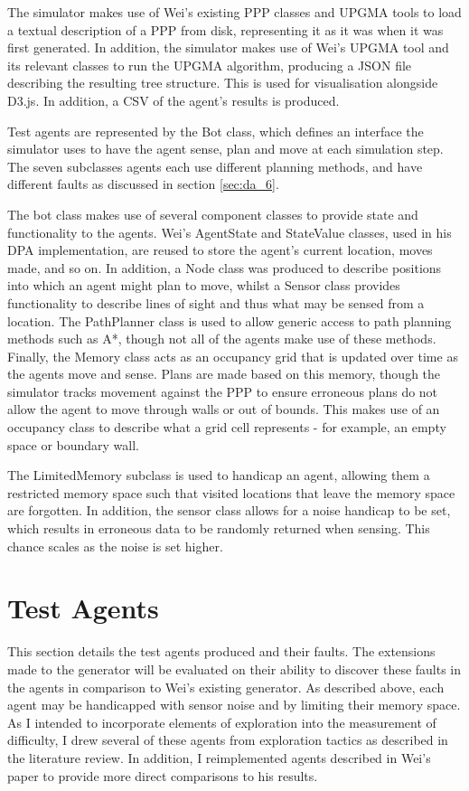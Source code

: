 \documentclass[authoryearcitations]{UoYCSproject}
\begin{document}
The simulator makes use of Wei's existing PPP classes and UPGMA tools to load a textual description of a PPP from disk, representing it as it was when it was first generated. In addition, the simulator makes use of Wei's UPGMA tool and its relevant classes to run the UPGMA algorithm, producing a JSON file describing the resulting tree structure. This is used for visualisation alongside D3.js. In addition, a CSV of the agent’s results is produced.

Test agents are represented by the Bot class, which defines an interface the simulator uses to have the agent sense, plan and move at each simulation step. The seven subclasses agents each use different planning methods, and have different faults as discussed in section \ref{sec:da_6}.

The bot class makes use of several component classes to provide state and functionality to the agents. Wei's AgentState and StateValue classes, used in his DPA implementation, are reused to store the agent's current location, moves made, and so on. In addition, a Node class was produced to describe positions into which an agent might plan to move, whilst a Sensor class provides functionality to describe lines of sight and thus what may be sensed from a location. The PathPlanner class is used to allow generic access to path planning methods such as A*, though not all of the agents make use of these methods. Finally, the Memory class acts as an occupancy grid that is updated over time as the agents move and sense. Plans are made based on this memory, though the simulator tracks movement against the PPP to ensure erroneous plans do not allow the agent to move through walls or out of bounds. This makes use of an occupancy class to describe what a grid cell represents - for example, an empty space or boundary wall.

The LimitedMemory subclass is used to handicap an agent, allowing them a restricted memory space such that visited locations that leave the memory space are forgotten. In addition, the sensor class allows for a noise handicap to be set, which results in erroneous data to be randomly returned when sensing. This chance scales as the noise is set higher.

\section{Test Agents}
\label{sec:da_5}
This section details the test agents produced and their faults. The extensions made to the generator will be evaluated on their ability to discover these faults in the agents in comparison to Wei's existing generator. As described above, each agent may be handicapped with sensor noise and by limiting their memory space. As I intended to incorporate elements of exploration into the measurement of difficulty, I drew several of these agents from exploration tactics as described in the literature review. In addition, I reimplemented agents described in Wei's paper to provide more direct comparisons to his results.
\end{document}
